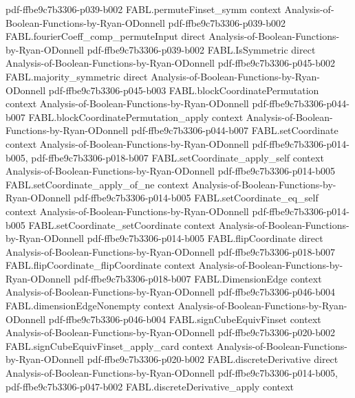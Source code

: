 \begin{theorem}
  {pdf-ffbe9c7b3306-p039-b002}
\proofstep
  {FABL.permuteFinset_symm}
  {context}
  {Analysis-of-Boolean-Functions-by-Ryan-ODonnell}
  {pdf-ffbe9c7b3306-p039-b002}
\proofstep
  {FABL.fourierCoeff_comp_permuteInput}
  {direct}
  {Analysis-of-Boolean-Functions-by-Ryan-ODonnell}
  {pdf-ffbe9c7b3306-p039-b002}
\proofstep
  {FABL.IsSymmetric}
  {direct}
  {Analysis-of-Boolean-Functions-by-Ryan-ODonnell}
  {pdf-ffbe9c7b3306-p045-b002}
\proofstep
  {FABL.majority_symmetric}
  {direct}
  {Analysis-of-Boolean-Functions-by-Ryan-ODonnell}
  {pdf-ffbe9c7b3306-p045-b003}
\proofstep
  {FABL.blockCoordinatePermutation}
  {context}
  {Analysis-of-Boolean-Functions-by-Ryan-ODonnell}
  {pdf-ffbe9c7b3306-p044-b007}
\proofstep
  {FABL.blockCoordinatePermutation_apply}
  {context}
  {Analysis-of-Boolean-Functions-by-Ryan-ODonnell}
  {pdf-ffbe9c7b3306-p044-b007}
\proofstep
  {FABL.setCoordinate}
  {context}
  {Analysis-of-Boolean-Functions-by-Ryan-ODonnell}
  {pdf-ffbe9c7b3306-p014-b005,
    pdf-ffbe9c7b3306-p018-b007}
\proofstep
  {FABL.setCoordinate_apply_self}
  {context}
  {Analysis-of-Boolean-Functions-by-Ryan-ODonnell}
  {pdf-ffbe9c7b3306-p014-b005}
\proofstep
  {FABL.setCoordinate_apply_of_ne}
  {context}
  {Analysis-of-Boolean-Functions-by-Ryan-ODonnell}
  {pdf-ffbe9c7b3306-p014-b005}
\proofstep
  {FABL.setCoordinate_eq_self}
  {context}
  {Analysis-of-Boolean-Functions-by-Ryan-ODonnell}
  {pdf-ffbe9c7b3306-p014-b005}
\proofstep
  {FABL.setCoordinate_setCoordinate}
  {context}
  {Analysis-of-Boolean-Functions-by-Ryan-ODonnell}
  {pdf-ffbe9c7b3306-p014-b005}
\proofstep
  {FABL.flipCoordinate}
  {direct}
  {Analysis-of-Boolean-Functions-by-Ryan-ODonnell}
  {pdf-ffbe9c7b3306-p018-b007}
\proofstep
  {FABL.flipCoordinate_flipCoordinate}
  {context}
  {Analysis-of-Boolean-Functions-by-Ryan-ODonnell}
  {pdf-ffbe9c7b3306-p018-b007}
\proofstep
  {FABL.DimensionEdge}
  {context}
  {Analysis-of-Boolean-Functions-by-Ryan-ODonnell}
  {pdf-ffbe9c7b3306-p046-b004}
\proofstep
  {FABL.dimensionEdgeNonempty}
  {context}
  {Analysis-of-Boolean-Functions-by-Ryan-ODonnell}
  {pdf-ffbe9c7b3306-p046-b004}
\proofstep
  {FABL.signCubeEquivFinset}
  {context}
  {Analysis-of-Boolean-Functions-by-Ryan-ODonnell}
  {pdf-ffbe9c7b3306-p020-b002}
\proofstep
  {FABL.signCubeEquivFinset_apply_card}
  {context}
  {Analysis-of-Boolean-Functions-by-Ryan-ODonnell}
  {pdf-ffbe9c7b3306-p020-b002}
\proofstep
  {FABL.discreteDerivative}
  {direct}
  {Analysis-of-Boolean-Functions-by-Ryan-ODonnell}
  {pdf-ffbe9c7b3306-p014-b005,
    pdf-ffbe9c7b3306-p047-b002}
\proofstep
  {FABL.discreteDerivative_apply}
  {context}

\end{theorem}
